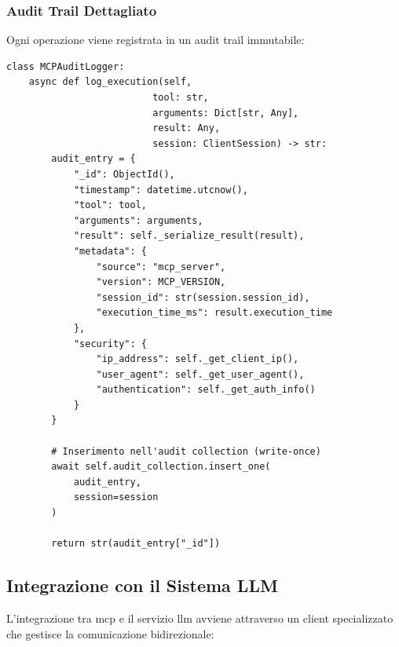 \subsubsection{Audit Trail Dettagliato}
Ogni operazione viene registrata in un audit trail immutabile:

\begin{listing}[H]
\begin{verbatim}
class MCPAuditLogger:
    async def log_execution(self, 
                          tool: str, 
                          arguments: Dict[str, Any],
                          result: Any,
                          session: ClientSession) -> str:
        audit_entry = {
            "_id": ObjectId(),
            "timestamp": datetime.utcnow(),
            "tool": tool,
            "arguments": arguments,
            "result": self._serialize_result(result),
            "metadata": {
                "source": "mcp_server",
                "version": MCP_VERSION,
                "session_id": str(session.session_id),
                "execution_time_ms": result.execution_time
            },
            "security": {
                "ip_address": self._get_client_ip(),
                "user_agent": self._get_user_agent(),
                "authentication": self._get_auth_info()
            }
        }
        
        # Inserimento nell'audit collection (write-once)
        await self.audit_collection.insert_one(
            audit_entry, 
            session=session
        )
        
        return str(audit_entry["_id"])
\end{verbatim}
\caption{Sistema di audit trail MCP}
\label{listing:mcp-audit}
\end{listing}

\subsection{Integrazione con il Sistema LLM}
\label{subsec:mcp_llm_integration}

L'integrazione tra \gls{mcp} e il servizio \gls{llm} avviene attraverso un client specializzato che gestisce la comunicazione bidirezionale:

